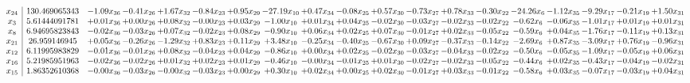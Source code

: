 \documentclass[9pt]{article}
\begin{document}
 \[\begin{array}{c| c c@{\hskip 2pt} c@{\hskip 2pt} c@{\hskip 2pt} c@{\hskip 2pt} c@{\hskip 2pt} c@{\hskip 2pt} c@{\hskip 2pt} c@{\hskip 2pt} c@{\hskip 2pt} c@{\hskip 2pt} c@{\hskip 2pt} c@{\hskip 2pt} c@{\hskip 2pt} c@{\hskip 2pt} c@{\hskip 2pt} c@{\hskip 2pt} c@{\hskip 2pt} }
 x_{24}   &  130.469065343 & -1.09 x_{36} & -0.41 x_{26} & +  1.67 x_{32} & -0.84 x_{23} & +  0.95 x_{29} & -27.19 x_{10} & +  0.47 x_{34} & -0.08 x_{25} & +  0.57 x_{30} & -0.73 x_{27} & +  0.78 x_{33} & -0.30 x_{22} & -24.26 x_{6} & -1.12 x_{35} & -9.29 x_{17} & -0.21 x_{19} & +  1.50 x_{31}\\
 x_{3}   &  5.61444091781 & +  0.01 x_{36} & +  0.00 x_{26} & +  0.08 x_{32} & -0.00 x_{23} & +  0.03 x_{29} & -1.00 x_{10} & +  0.01 x_{34} & +  0.04 x_{25} & -0.02 x_{30} & -0.03 x_{27} & -0.02 x_{33} & -0.02 x_{22} & -0.62 x_{6} & -0.06 x_{35} & -1.01 x_{17} & +  0.01 x_{19} & +  0.01 x_{31}\\
 x_{8}   &  6.94695823843 & -0.02 x_{36} & -0.03 x_{26} & +  0.07 x_{32} & -0.02 x_{23} & +  0.08 x_{29} & -0.90 x_{10} & +  0.06 x_{34} & +  0.02 x_{25} & +  0.07 x_{30} & -0.01 x_{27} & +  0.02 x_{33} & -0.05 x_{22} & -0.59 x_{6} & +  0.04 x_{35} & -1.76 x_{17} & -0.11 x_{19} & +  0.13 x_{31}\\
 x_{21}   &  26.959146945 & +  0.05 x_{36} & -0.26 x_{26} & -1.29 x_{32} & +  0.83 x_{23} & +  0.11 x_{29} & +  3.48 x_{10} & -0.25 x_{34} & -0.40 x_{25} & -0.67 x_{30} & +  0.09 x_{27} & -0.37 x_{33} & -0.14 x_{22} & -2.69 x_{6} & +  0.87 x_{35} & -3.09 x_{17} & +  0.76 x_{19} & -0.96 x_{31}\\
 x_{12}   &  6.11995983829 & -0.01 x_{36} & -0.01 x_{26} & +  0.08 x_{32} & -0.04 x_{23} & +  0.04 x_{29} & -0.86 x_{10} & +  0.00 x_{34} & +  0.02 x_{25} & -0.02 x_{30} & -0.03 x_{27} & -0.04 x_{33} & -0.02 x_{22} & -0.50 x_{6} & -0.05 x_{35} & -1.09 x_{17} & -0.05 x_{19} & +  0.06 x_{31}\\
 x_{16}   &  5.21985951963 & -0.02 x_{36} & -0.02 x_{26} & +  0.01 x_{32} & +  0.02 x_{23} & +  0.01 x_{29} & -0.46 x_{10} & -0.00 x_{34} & -0.01 x_{25} & +  0.01 x_{30} & -0.02 x_{27} & -0.02 x_{33} & -0.05 x_{22} & -0.44 x_{6} & +  0.02 x_{35} & -0.43 x_{17} & -0.04 x_{19} & -0.02 x_{31}\\
 x_{15}   &  1.86352610368 & -0.00 x_{36} & -0.03 x_{26} & -0.00 x_{32} & -0.03 x_{23} & +  0.00 x_{29} & +  0.30 x_{10} & +  0.02 x_{34} & +  0.00 x_{25} & +  0.02 x_{30} & -0.01 x_{27} & +  0.03 x_{33} & -0.01 x_{22} & -0.58 x_{6} & +  0.03 x_{35} & -0.07 x_{17} & -0.03 x_{19} & +  0.04 x_{31}\\

\end{array}\]
\end{document}
